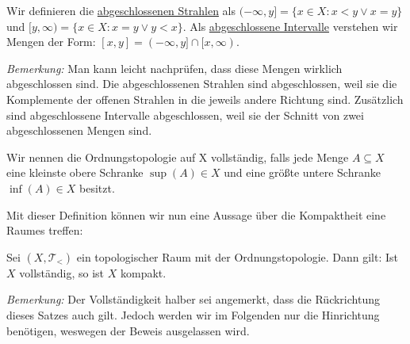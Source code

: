 \documentclass[11pt]{scrartcl}
\begin{document}
\begin{definition}
	Wir definieren die \underline{abgeschlossenen Strahlen} als $(-\infty, y]=\{ x\in X: x < y \lor x = y\}$ und $[y, \infty)=\{ x\in X: x=y \lor y < x\}$. Als \underline{abgeschlossene Intervalle} verstehen wir Mengen der Form: $[x,y]=(-\infty,y]\cap [x,\infty)$.
\end{definition}
\noindent \textit{Bemerkung: } Man kann leicht nachprüfen, dass diese Mengen wirklich abgeschlossen sind. Die abgeschlossenen Strahlen sind abgeschlossen, weil sie die Komplemente der offenen Strahlen in die jeweils andere Richtung sind. Zusätzlich sind abgeschlossene Intervalle abgeschlossen, weil sie der Schnitt von zwei abgeschlossenen Mengen sind.
\begin{definition}
	Wir nennen die Ordnungstopologie auf X vollständig, falls jede Menge $ A \subseteq X$ eine kleinste obere Schranke $ \sup(A) \in X$ und eine größte untere Schranke $\inf(A) \in X$ besitzt.
\end{definition}
\noindent Mit dieser Definition können wir nun eine Aussage über die Kompaktheit eine Raumes treffen:
\begin{theorem}\label{completeIffCompact}
	Sei $(X, \mathcal T_{<})$ ein topologischer Raum mit der Ordnungstopologie. Dann gilt: Ist $X$ vollständig, so ist $X$ kompakt.
\end{theorem}
\textit{Bemerkung:} Der Vollständigkeit halber sei angemerkt, dass die Rückrichtung dieses Satzes auch gilt. Jedoch werden wir im Folgenden nur die Hinrichtung benötigen, weswegen der Beweis ausgelassen wird.
\end{document}
